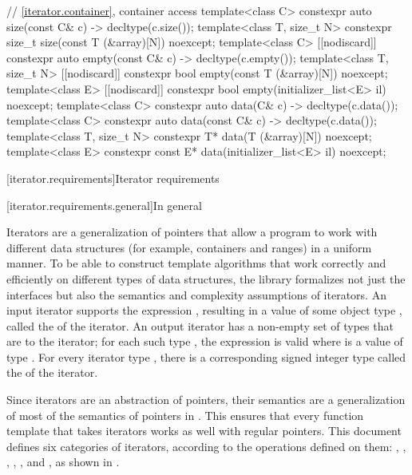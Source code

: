 \begin{codeblock}
{  // \ref{iterator.container}, container access
  template<class C> constexpr auto size(const C& c) -> decltype(c.size());
  template<class T, size_t N> constexpr size_t size(const T (&array)[N]) noexcept;
  template<class C> [[nodiscard]] constexpr auto empty(const C& c) -> decltype(c.empty());
  template<class T, size_t N> [[nodiscard]] constexpr bool empty(const T (&array)[N]) noexcept;
  template<class E> [[nodiscard]] constexpr bool empty(initializer_list<E> il) noexcept;
  template<class C> constexpr auto data(C& c) -> decltype(c.data());
  template<class C> constexpr auto data(const C& c) -> decltype(c.data());
  template<class T, size_t N> constexpr T* data(T (&array)[N]) noexcept;
  template<class E> constexpr const E* data(initializer_list<E> il) noexcept;
}
\end{codeblock}

[iterator.requirements]{Iterator requirements}

[iterator.requirements.general]{In general}

\pnum
{}%
Iterators are a generalization of pointers that allow a \Cpp{} program to work with different data structures
(for example, containers and ranges) in a uniform manner.
To be able to construct template algorithms that work correctly and
efficiently on different types of data structures, the library formalizes not just the interfaces but also the
semantics and complexity assumptions of iterators.
An input iterator
supports the expression
,
resulting in a value of some object type
,
called the
of the iterator.
An output iterator  has a non-empty set of types that are
 to the iterator;
for each such type , the expression 
is valid where  is a value of type .
For every iterator type
,
there is a corresponding signed integer type called the
of the iterator.

\pnum
Since iterators are an abstraction of pointers, their semantics are
a generalization of most of the semantics of pointers in \Cpp{}.
This ensures that every
function template
that takes iterators
works as well with regular pointers.
This document defines
six categories of iterators, according to the operations
defined on them:
,
,
,
,
,
and
,
as shown in .


